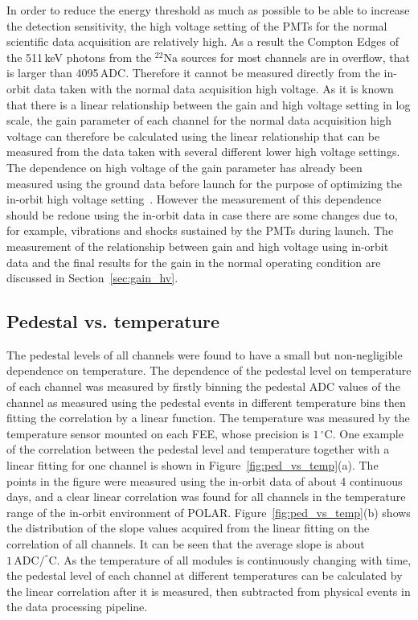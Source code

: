 \documentclass[preprint,sort&compress,12pt]{elsarticle}
\begin{document}
In order to reduce the energy threshold as much as possible to be able to increase the detection sensitivity, the high voltage setting of the PMTs for the normal scientific data acquisition are relatively high. As a result the Compton Edges of the 511\,keV photons from the $^{22}\mathrm{Na}$ sources for most channels are in overflow, that is larger than 4095\,ADC. Therefore it cannot be measured directly from the in-orbit data taken with the normal data acquisition high voltage. As it is known that there is a linear relationship between the gain and high voltage setting in log scale, the gain parameter of each channel for the normal data acquisition high voltage can therefore be calculated using the linear relationship that can be measured from the data taken with several different lower high voltage settings. The dependence on high voltage of the gain parameter has already been measured using the ground data before launch for the purpose of optimizing the in-orbit high voltage setting~\cite{Zhang2018}. However the measurement of this dependence should be redone using the in-orbit data in case there are some changes due to, for example, vibrations and shocks sustained by the PMTs during launch. The measurement of the relationship between gain and high voltage using in-orbit data and the final results for the gain in the normal operating condition are discussed in Section~\ref{sec:gain_hv}.

\subsection{Pedestal vs. temperature}\label{sec:ped_temp}

The pedestal levels of all channels were found to have a small but non-negligible dependence on temperature. The dependence of the pedestal level on temperature of each channel was measured by firstly binning the pedestal ADC values of the channel as measured using the pedestal events in different temperature bins then fitting the correlation by a linear function. The temperature was measured by the temperature sensor mounted on each FEE, whose precision is $1\,^\circ\mathrm{C}$. One example of the correlation between the pedestal level and temperature together with a linear fitting for one channel is shown in Figure~\ref{fig:ped_vs_temp}(a). The points in the figure were measured using the in-orbit data of about 4 continuous days, and a clear linear correlation was found for all channels in the temperature range of the in-orbit environment of POLAR. Figure~\ref{fig:ped_vs_temp}(b) shows the distribution of the slope values acquired from the linear fitting on the correlation of all channels. It can be seen that the average slope is about $1\,\mathrm{ADC}/^\circ\mathrm{C}$. As the temperature of all modules is continuously changing with time, the pedestal level of each channel at different temperatures can be calculated by the linear correlation after it is measured, then subtracted from physical events in the data processing pipeline.
\end{document}
